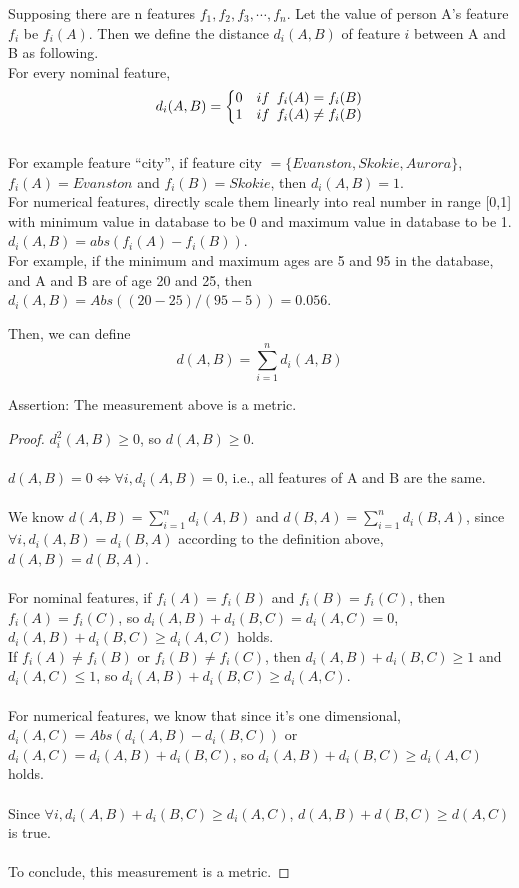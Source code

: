 \documentclass[11pt]{article}
\begin{document}
Supposing there are n features $f_1, f_2, f_3, \cdots, f_n$. Let the value of person A's feature $f_i$ be $f_i(A)$. Then we define the distance $d_{i}(A,B)$ of feature $i$ between A and B as following.
\\For every nominal feature,  
$$d_{i}(A,B)=\left\{\begin{matrix}
0 \text{\hspace{10pt}} if \text{\hspace{5pt}} f_i(A)=f_i(B)\\
1 \text{\hspace{10pt}} if \text{\hspace{5pt}} f_i(A) \neq f_i(B)\\
\end{matrix}\right.$$
\\For example feature ``city'', if feature city $=\{Evanston, Skokie, Aurora\}$, $f_i(A)=Evanston$ and $f_i(B)=Skokie$, then $d_{i}(A,B)=1$.
\\For numerical features, directly scale them linearly into real number in range [0,1] with minimum value in database to be 0 and maximum value in database to be 1. $d_{i}(A,B)=abs(f_i(A)-f_i(B))$.
\\For example, if the minimum and maximum ages are 5 and 95 in the database, and A and B are of age 20 and 25, then $d_{i}(A,B)=Abs((20-25)/(95-5))=0.056$.

Then, we can define
$$d(A,B)=\sum_{i=1}^n d_{i}(A,B)$$

\noindent Assertion:  The measurement above is a metric.

\begin{proof}
$d_{i}^{2}(A,B)\geq0$, so $d(A,B) \geq 0$.
\\ \\$d(A,B) = 0 \iff \forall i, d_{i}(A,B) = 0$, i.e., all features of A and B are the same. 
\\ \\We know $d(A,B)=\sum_{i=1}^n d_{i}(A,B)$ and $d(B,A)=\sum_{i=1}^n d_{i}(B,A)$, since $\forall i, d_{i}(A,B)=d_{i}(B,A)$ according to the definition above, $d(A,B)=d(B,A)$.
\\ \\For nominal features, if $f_i(A)=f_i(B)$ and $f_i(B)=f_i(C)$, then $f_i(A)=f_i(C)$, so $d_i(A,B)+d_i(B,C) = d_i(A,C) = 0$, $d_i(A,B)+d_i(B,C) \geq d_i(A,C)$ holds.
\\ If $f_i(A) \neq f_i(B)$ or $f_i(B) \neq f_i(C)$, then $d_i(A,B)+d_i(B,C) \geq 1$ and $d_i(A,C) \leq 1$, so $d_i(A,B)+d_i(B,C) \geq d_i(A,C)$.
\\ \\For numerical features, we know that since it's one dimensional, $d_i(A,C)=Abs(d_i(A,B)-d_i(B,C))$ or $d_i(A,C)=d_i(A,B)+d_i(B,C)$, so $d_i(A,B)+d_i(B,C) \geq d_i(A,C)$ holds.
\\ \\Since $\forall i, d_i(A,B)+d_i(B,C) \geq d_i(A,C)$, $d(A,B)+d(B,C) \geq d(A,C)$ is true.
\\ \\To conclude, this measurement is a metric.
\end{proof}
\end{document}
